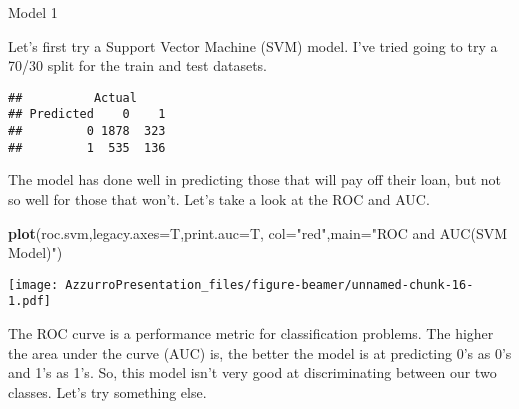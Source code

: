 \documentclass[ignorenonframetext,]{beamer}
\newenvironment{Shaded}{\begin{snugshade}}{\end{snugshade}}
\newcommand{\KeywordTok}[1]{\textcolor[rgb]{0.13,0.29,0.53}{\textbf{{#1}}}}
\newcommand{\DataTypeTok}[1]{\textcolor[rgb]{0.13,0.29,0.53}{{#1}}}
\newcommand{\StringTok}[1]{\textcolor[rgb]{0.31,0.60,0.02}{{#1}}}
\newcommand{\NormalTok}[1]{{#1}}
\begin{document}
\begin{frame}[fragile]{Model 1}

Let's first try a Support Vector Machine (SVM) model. I've tried going
to try a 70/30 split for the train and test datasets.

\begin{Shaded}
\end{Shaded}

\begin{verbatim}
##          Actual
## Predicted    0    1
##         0 1878  323
##         1  535  136
\end{verbatim}

The model has done well in predicting those that will pay off their
loan, but not so well for those that won't. Let's take a look at the ROC
and AUC.

\end{frame}

\begin{frame}[fragile]

\begin{Shaded}
\begin{Highlighting}[]
\KeywordTok{plot}\NormalTok{(roc.svm,}\DataTypeTok{legacy.axes=}\NormalTok{T,}\DataTypeTok{print.auc=}\NormalTok{T, }\DataTypeTok{col=}\StringTok{"red"}\NormalTok{,}\DataTypeTok{main=}\StringTok{"ROC and AUC(SVM Model)"}\NormalTok{)}
\end{Highlighting}
\end{Shaded}

\texttt{[image: AzzurroPresentation\_files/figure-beamer/unnamed-chunk-16-1.pdf]}

The ROC curve is a performance metric for classification problems. The
higher the area under the curve (AUC) is, the better the model is at
predicting 0's as 0's and 1's as 1's. So, this model isn't very good at
discriminating between our two classes. Let's try something else.

\end{frame}
\end{document}
